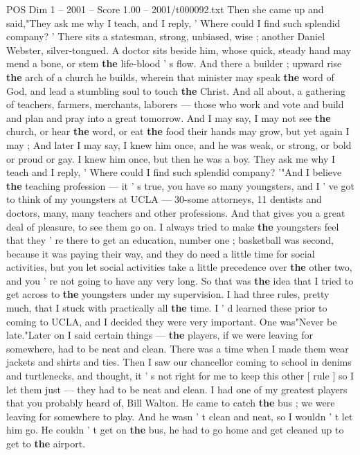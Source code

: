 \begin{textsample}{POS Dim 1 – 2001 – Score 1.00 – 2001/t000092.txt}
Then she came up and said,"They ask me why I teach, and I reply, ' Where could I find such splendid company? ' There sits a statesman, strong, unbiased, wise ; another Daniel Webster, silver-tongued.
A doctor sits beside him, whose quick, steady hand may mend a bone, or stem \textbf{the} life-blood ' s flow.
And there a builder ; upward rise \textbf{the} arch of a church he builds, wherein that minister may speak \textbf{the} word of God, and lead a stumbling soul to touch \textbf{the} Christ.
And all about, a gathering of teachers, farmers, merchants, laborers — those who work and vote and build and plan and pray into a great tomorrow.
And I may say, I may not see \textbf{the} church, or hear \textbf{the} word, or eat \textbf{the} food their hands may grow, but yet again I may ; And later I may say, I knew him once, and he was weak, or strong, or bold or proud or gay.
I knew him once, but then he was a boy.
They ask me why I teach and I reply, ' Where could I find such splendid company? '"And I believe \textbf{the} teaching profession — it ' s true, you have so many youngsters, and I ' ve got to think of my youngsters at UCLA — 30-some attorneys, 11 dentists and doctors, many, many teachers and other professions.
And that gives you a great deal of pleasure, to see them go on.
I always tried to make \textbf{the} youngsters feel that they ' re there to get an education, number one ; basketball was second, because it was paying their way, and they do need a little time for social activities, but you let social activities take a little precedence over \textbf{the} other two, and you ' re not going to have any very long.
So that was \textbf{the} idea that I tried to get across to \textbf{the} youngsters under my supervision.
I had three rules, pretty much, that I stuck with practically all \textbf{the} time.
I ' d learned these prior to coming to UCLA, and I decided they were very important.
One was"Never be late."Later on I said certain things — \textbf{the} players, if we were leaving for somewhere, had to be neat and clean.
There was a time when I made them wear jackets and shirts and ties.
Then I saw our chancellor coming to school in denims and turtlenecks, and thought, it ' s not right for me to keep this other [ rule ] so I let them just — they had to be neat and clean.
I had one of my greatest players that you probably heard of, Bill Walton.
He came to catch \textbf{the} bus ; we were leaving for somewhere to play.
And he wasn ' t clean and neat, so I wouldn ' t let him go.
He couldn ' t get on \textbf{the} bus, he had to go home and get cleaned up to get to \textbf{the} airport.

\end{textsample}
